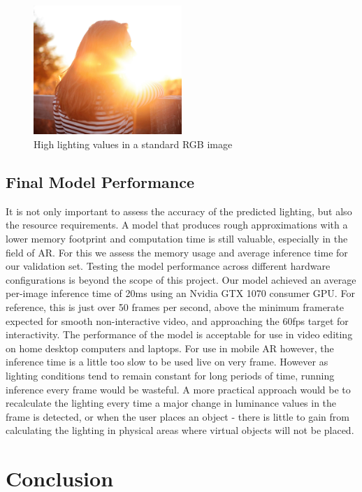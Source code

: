\documentclass[ %
                    author={Gavin Parker},
                supervisor={Dr. Neill Campbell},
                    degree={MEng},
                     title={Deep Siamese Networks for Illumination Estimation from Stereo Images},
                  subtitle={},
                      type={Research},
                      year={2018} ]{dissertation}
\begin{document}
\begin{figure}[h]
\centering
\includegraphics[width=0.5\textwidth]{exposure_example}
\caption{High lighting values in a standard RGB image}
\label{rgb_example}
\end{figure}

\section{Final Model Performance}
It is not only important to assess the accuracy of the predicted lighting, but also the resource requirements. A model that produces rough approximations with a lower memory footprint and computation time is still valuable, especially in the field of AR. For this we assess the memory usage and average inference time for our validation set. Testing the model performance across different hardware configurations is beyond the scope of this project. Our model achieved an average per-image inference time of 20ms using an Nvidia GTX 1070 consumer GPU. For reference, this is just over 50 frames per second, above the minimum framerate expected for smooth non-interactive video, and approaching the 60fps target for interactivity. The performance of the model is acceptable for use in video editing on home desktop computers and laptops. For use in mobile AR however, the inference time is a little too slow to be used live on very frame. However as lighting conditions tend to remain constant for long periods of time, running inference every frame would be wasteful. A more practical approach would be to recalculate the lighting every time a major change in luminance values in the frame is detected, or when the user places an object - there is little to gain from calculating the lighting in physical areas where virtual objects will not be placed.
\chapter{Conclusion}
\label{chap:conclusion}
\end{document}
